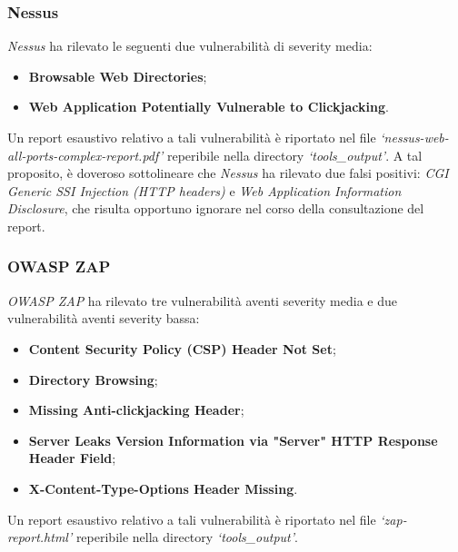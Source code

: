 \documentclass[a4paper,11pt,oneside,top=3cm,bottom=3cm,left=3.5cm,right=3.5cm,openright,reqno,table]{book}
\begin{document}
\subsubsection{Nessus}
\emph{Nessus} ha rilevato le seguenti due vulnerabilità di severity media:
\begin{itemize}
    \item \textbf{Browsable Web Directories};
    \item \textbf{Web Application Potentially Vulnerable to Clickjacking}.
\end{itemize}
Un report esaustivo relativo a tali vulnerabilità è riportato nel file \emph{`nessus-web-all-ports-complex-report.pdf'} reperibile nella directory \emph{`tools\_output'}. A tal proposito, è doveroso sottolineare che \emph{Nessus} ha rilevato due falsi positivi: \emph{CGI Generic SSI Injection (HTTP headers)} e \emph{Web Application Information Disclosure}, che risulta opportuno ignorare nel corso della consultazione del report.
\subsubsection{OWASP ZAP}
\emph{OWASP ZAP} ha rilevato tre vulnerabilità aventi severity media e due vulnerabilità aventi severity bassa:
\begin{itemize}
    \item \textbf{Content Security Policy (CSP) Header Not Set};
    \item \textbf{Directory Browsing};
    \item \textbf{Missing Anti-clickjacking Header};
    \item \textbf{Server Leaks Version Information via "Server" HTTP Response Header Field};
    \item \textbf{X-Content-Type-Options Header Missing}.
\end{itemize}
Un report esaustivo relativo a tali vulnerabilità è riportato nel file \emph{`zap-report.html'} reperibile nella directory \emph{`tools\_output'}.
\end{document}

